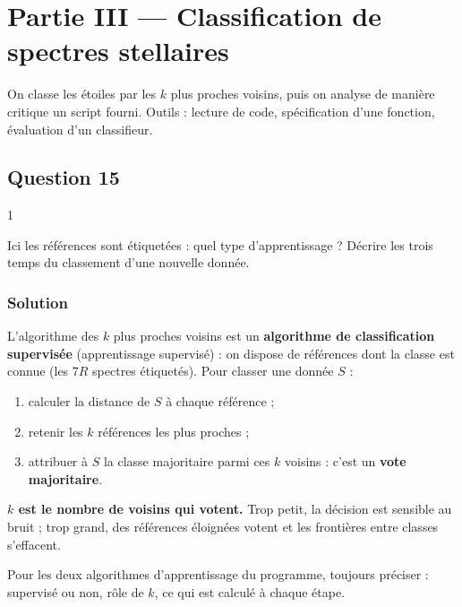 \documentclass[11pt,a4paper]{article}
\providecommand{\tightlist}{\setlength{\itemsep}{0pt}\setlength{\parskip}{0pt}}
\begin{document}
\hypertarget{partie-iii-classification-de-spectres-stellaires}{%
\section{Partie III --- Classification de spectres stellaires}\label{partie-iii-classification-de-spectres-stellaires}}

On classe les étoiles par les \(k\) plus proches voisins, puis on analyse de manière critique un script fourni. Outils : lecture de code, spécification d'une fonction, évaluation d'un classifieur.

\hypertarget{question-15}{%
\subsection{Question 15}\label{question-15}}

\begin{indication}{1}

Ici les références sont étiquetées : quel type d'apprentissage ? Décrire les trois temps du classement d'une nouvelle donnée.

\end{indication}

\hypertarget{solution-14}{%
\subsubsection{Solution}\label{solution-14}}

L'algorithme des \(k\) plus proches voisins est un \textbf{algorithme de classification supervisée} (apprentissage supervisé) : on dispose de références dont la classe est connue (les \(7R\) spectres étiquetés). Pour classer une donnée \(S\) :

\begin{enumerate}
\def\labelenumi{\arabic{enumi}.}
\tightlist
\item
  calculer la distance de \(S\) à chaque référence ;
\item
  retenir les \(k\) références les plus proches ;
\item
  attribuer à \(S\) la classe majoritaire parmi ces \(k\) voisins : c'est un \textbf{vote majoritaire}.
\end{enumerate}

\textbf{\(k\) est le nombre de voisins qui votent.} Trop petit, la décision est sensible au bruit ; trop grand, des références éloignées votent et les frontières entre classes s'effacent.

\begin{methode}

Pour les deux algorithmes d'apprentissage du programme, toujours préciser : supervisé ou non, rôle de \(k\), ce qui est calculé à chaque étape.

\end{methode}
\end{document}
